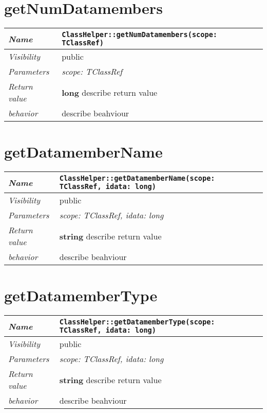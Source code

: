  \section{getNumDatamembers}
\begin{longtable}{p{3cm} @{\hskip 1cm} p{12cm}}
 \hline
\textit{Name} & \texttt{ClassHelper::getNumDatamembers(scope: TClassRef)}\\
\hline
 \textit{Visibility} & public\\
\hline
\textit{Parameters} & \textit{scope: TClassRef}\\
\hline
\textit{Return value} & \textbf{ long} describe return value\\
  \hline
 \textit{behavior} & describe beahviour \\
\hline
\end{longtable} \pagebreak
 \section{getDatamemberName}
\begin{longtable}{p{3cm} @{\hskip 1cm} p{12cm}}
 \hline
\textit{Name} & \texttt{ClassHelper::getDatamemberName(scope: TClassRef, idata: long)}\\
\hline
 \textit{Visibility} & public\\
\hline
\textit{Parameters} & \textit{scope: TClassRef, idata: long}\\
\hline
\textit{Return value} & \textbf{ string} describe return value\\
  \hline
 \textit{behavior} & describe beahviour \\
\hline
\end{longtable} \pagebreak
 \section{getDatamemberType}
\begin{longtable}{p{3cm} @{\hskip 1cm} p{12cm}}
 \hline
\textit{Name} & \texttt{ClassHelper::getDatamemberType(scope: TClassRef, idata: long)}\\
\hline
 \textit{Visibility} & public\\
\hline
\textit{Parameters} & \textit{scope: TClassRef, idata: long}\\
\hline
\textit{Return value} & \textbf{ string} describe return value\\
  \hline
 \textit{behavior} & describe beahviour \\
\hline
\end{longtable} \pagebreak
